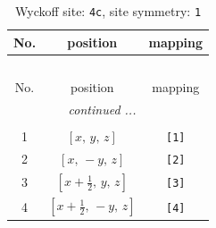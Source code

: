 \documentclass[fleqn,8pt]{jsarticle}
\begin{document}
\begin{longtable}{ccc}
\caption{Wyckoff site: {\tt 4c}, site symmetry: {\tt 1}}
 \\
 \hline \hline
No. & position & mapping \\ \hline \endfirsthead

\multicolumn{2}{l}{\tablename\ \thetable{}} \\
 \hline \hline
No. & position & mapping \\ \hline \endhead

 \hline \hline
\multicolumn{2}{r}{\footnotesize\it continued ...} \\ \endfoot

 \hline \hline
\multicolumn{2}{r}{} \\ \endlastfoot

1 & $\left[ x,\, y,\, z \right]$ & {\tt [1]} \\ \hline
2 & $\left[ x,\, - y,\, z \right]$ & {\tt [2]} \\ \hline
3 & $\left[ x + \frac{1}{2},\, y,\, z \right]$ & {\tt [3]} \\ \hline
4 & $\left[ x + \frac{1}{2},\, - y,\, z \right]$ & {\tt [4]} \\
\end{longtable}
\end{document}

